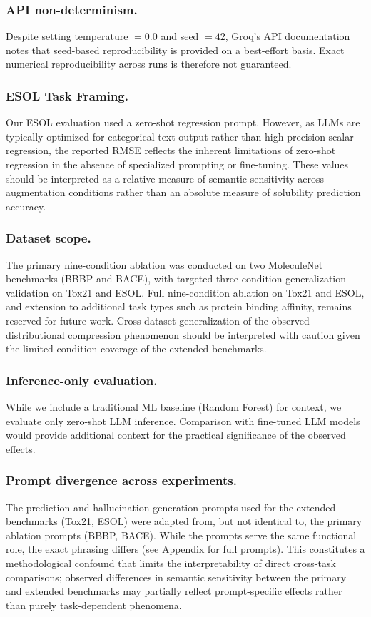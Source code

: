 \subsubsection*{API non-determinism.} Despite setting temperature $= 0.0$ and seed $= 42$, Groq's API documentation notes that seed-based reproducibility is provided on a best-effort basis. Exact numerical reproducibility across runs is therefore not guaranteed.

\subsubsection*{ESOL Task Framing.} Our ESOL evaluation used a zero-shot regression prompt. However, as LLMs are typically optimized for categorical text output rather than high-precision scalar regression, the reported RMSE reflects the inherent limitations of zero-shot regression in the absence of specialized prompting or fine-tuning. These values should be interpreted as a relative measure of semantic sensitivity across augmentation conditions rather than an absolute measure of solubility prediction accuracy.

\subsubsection*{Dataset scope.}
The primary nine-condition ablation was conducted on two 
MoleculeNet benchmarks (BBBP and BACE), with targeted 
three-condition generalization validation on Tox21 and 
ESOL. Full nine-condition ablation on Tox21 and ESOL, 
and extension to additional task types such as protein 
binding affinity, remains reserved for future work. 
Cross-dataset generalization of the observed 
distributional compression phenomenon should be 
interpreted with caution given the limited condition 
coverage of the extended benchmarks.

\subsubsection*{Inference-only evaluation.} While we include a traditional ML baseline (Random Forest) for context, we evaluate only zero-shot LLM inference. Comparison with fine-tuned LLM models would provide additional context for the practical significance of the observed effects.

\subsubsection*{Prompt divergence across experiments.} The prediction and hallucination generation prompts used for the extended benchmarks (Tox21, ESOL) were adapted from, but not identical to, the primary ablation prompts (BBBP, BACE). While the prompts serve the same functional role, the exact phrasing differs (see Appendix for full prompts). This constitutes a methodological confound that limits the interpretability of direct cross-task comparisons; observed differences in semantic sensitivity between the primary and extended benchmarks may partially reflect prompt-specific effects rather than purely task-dependent phenomena.

